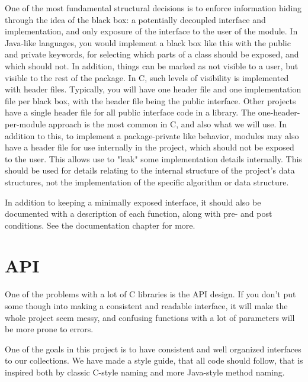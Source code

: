\documentclass[table]{ituthesis}
\begin{document}
One of the most fundamental structural decisions is to enforce information hiding through the idea of the black box: a potentially decoupled interface and implementation, and only exposure of the interface to the user of the module. In Java-like languages, you would implement a black box like this with the public and private keywords, for selecting which parts of a class should be exposed, and which should not. In addition, things can be marked as not visible to a user, but visible to the rest of the package. In C, such levels of visibility is implemented with header files. Typically, you will have one header file and one implementation file per black box, with the header file being the public interface. Other projects have a single header file for all public interface code in a library. The one-header-per-module approach is the most common in C, and also what we will use. In addition to this, to implement a package-private like behavior, modules may also have a header file for use internally in the project, which should not be exposed to the user. This allows use to "leak" some implementation details internally. This should be used for details relating to the internal structure of the project's data structures, not the implementation of the specific algorithm or data structure.

In addition to keeping a minimally exposed interface, it should also be documented with a description of each function, along with pre- and post conditions. See the documentation chapter for more.


\section{API}\label{sec:arch_api}
	One of the problems with a lot of C libraries is the API design. If you don't put some though into making a consistent and readable interface, it will make the whole project seem messy, and confusing functions with a lot of parameters will be more prone to errors.

	One of the goals in this project is to have consistent and well organized interfaces to our collections. We have made a style guide, that all code should follow, that is inspired both by classic C-style naming and more Java-style method naming.
\end{document}
